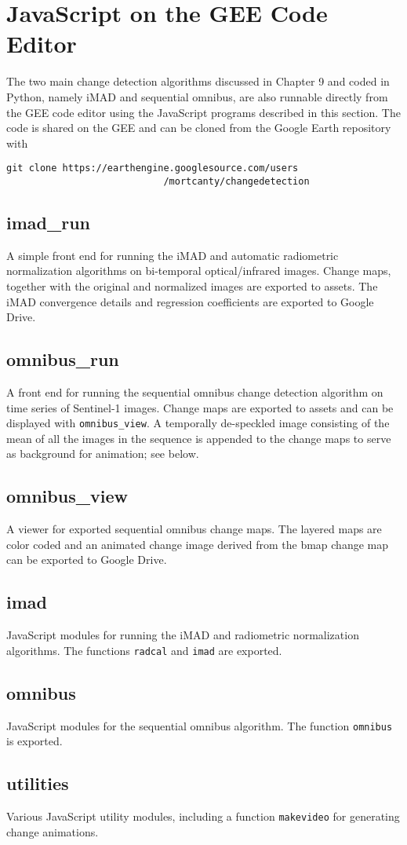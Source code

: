 \documentclass{paper}
\begin{document}
\section*{JavaScript on the GEE Code Editor}


The two main change detection algorithms discussed in Chapter 9 and coded in Python, namely iMAD and sequential omnibus, are also runnable directly from the GEE code editor using the JavaScript programs described in this section. The code is shared on the GEE and can be cloned from the Google Earth repository with
\begin{lstlisting}
git clone https://earthengine.googlesource.com/users
                            /mortcanty/changedetection
\end{lstlisting}




\subsection*{imad\_run}
A simple front end for running the iMAD and automatic radiometric normalization algorithms on bi-temporal optical/infrared images. Change maps, together with the original and normalized images are exported to assets. The iMAD convergence details and regression coefficients are exported to Google Drive.


\subsection*{omnibus\_run}
A front end for running the sequential omnibus change detection algorithm on time series of Sentinel-1 images. Change maps are exported to assets and can be displayed with {\tt omnibus\_view}. A temporally de-speckled image consisting of the mean of all the images in the sequence is appended to the change maps to serve as background for animation; see below.


\subsection*{omnibus\_view}
A viewer for exported sequential omnibus change maps. The layered maps are color coded and an animated change image derived from the bmap change map can be exported to Google Drive.


\subsection*{imad}
JavaScript modules for running the iMAD and radiometric normalization algorithms. The functions {\tt radcal} and {\tt imad} are exported.


\subsection*{omnibus}
JavaScript modules for the sequential omnibus algorithm. The function {\tt omni\-bus} is exported.


\subsection*{utilities}
Various JavaScript utility modules, including a function {\tt makevideo} for generating change animations.
\end{document}
